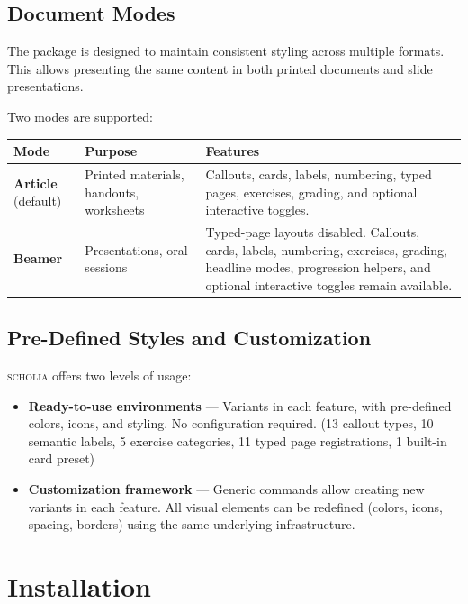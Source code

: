 \documentclass[11pt,a4paper]{article}
\newcommand{\scholia}{\textsc{scholia}\xspace}
\begin{document}
\subsection{Document Modes}

The package is designed to maintain consistent styling across multiple formats. This allows
presenting the same content in both printed documents and slide presentations.

Two modes are supported:

\begin{tabular}{@{}lp{4cm}p{6cm}@{}}
\toprule
\textbf{Mode} & \textbf{Purpose} & \textbf{Features} \\
\midrule
\textbf{Article} (default) & Printed materials, handouts, worksheets &
  Callouts, cards, labels, numbering, typed pages, exercises, grading, and optional
  interactive toggles. \\
\textbf{Beamer} & Presentations, oral sessions &
  Typed-page layouts disabled. Callouts, cards, labels, numbering, exercises,
  grading, headline modes, progression helpers, and optional interactive toggles
  remain available. \\
\bottomrule
\end{tabular}

\subsection{Pre-Defined Styles and Customization}

\scholia offers two levels of usage:

\begin{itemize}
  \item \textbf{Ready-to-use environments} --- Variants in each feature, with pre-defined colors, icons,
        and styling. No configuration required. (13 callout types, 10 semantic labels, 5 exercise categories,
        11 typed page registrations, 1 built-in card preset)
  \item \textbf{Customization framework} --- Generic commands allow creating new variants in each
  feature. All visual elements can be redefined (colors, icons, spacing, borders) using the same underlying infrastructure.
\end{itemize}

\section{Installation}
\end{document}
